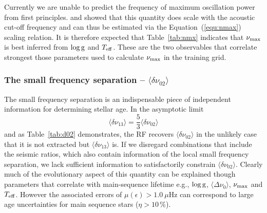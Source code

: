 Currently we are unable to predict the frequency of maximum oscillation power from first principles. \citet{1991ApJ...368..599B} and \citet{1995AA...293...87K} showed that this quantity does scale with the acoustic cut-off frequency and can thus be estimated via the Equation~(\ref{equ:nmax}) scaling relation. It is therefore expected that Table~\ref{tab:nmx} indicates that  $\nu_{\rm{max}}$ is best inferred from $\log \rm{g}$  and $T_{\rm{eff}}$. These are the two observables that correlate strongest those parameters used to calculate $\nu_{\rm{max}}$ in the training grid. 


\subsubsection*{The small frequency separation -- $\langle\delta\nu_{02}\rangle$}
The small frequency separation is an indispensable piece of independent information for determining stellar age. In the asymptotic limit \citep{1980ApJS...43..469T}
\begin{equation}
\langle\delta\nu_{13}\rangle = \frac{5}{3} \langle\delta\nu_{02}\rangle 
\end{equation}
and as Table~\ref{tab:d02} demonstrates, the RF recovers  $\langle\delta\nu_{02}\rangle$ in the unlikely case that it is not extracted but $\langle\delta\nu_{13}\rangle$ is.
If we disregard combinations that include the seismic ratios, which also contain information of the local small frequency separation, we lack sufficient information to satisfactorily constrain $\langle\delta\nu_{02}\rangle$. 
Clearly much of the evolutionary aspect of this quantity can be explained though parameters 
that correlate with main-sequence lifetime e.g.,  $\log \rm{g}$, $\langle\Delta\nu_0\rangle$,   $\nu_{\rm{max}}$ and  $T_{\rm{eff}}$. However the associated errors of $\mu (\epsilon) > 1.0 \ \mu$Hz can correspond to large age uncertainties for main sequence stars ($\eta > 10\,\%$). 




